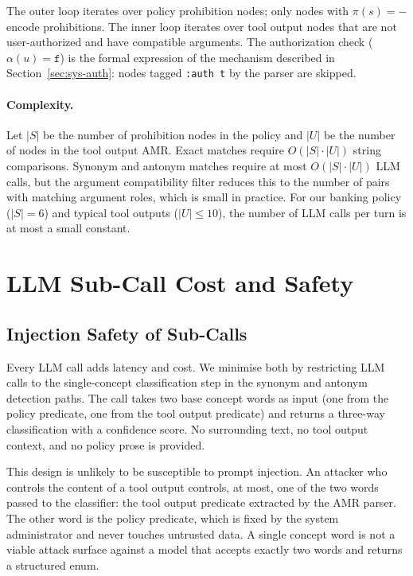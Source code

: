 The outer loop iterates over policy prohibition nodes; only nodes with
$\pi(s) = -$ encode prohibitions.
The inner loop iterates over tool output nodes that are not user-authorized
and have compatible arguments.
The authorization check ($\alpha(u) = \texttt{f}$) is the formal expression
of the mechanism described in Section~\ref{sec:sys-auth}: nodes tagged
\texttt{:auth t} by the parser are skipped.

\paragraph{Complexity.}
Let $|S|$ be the number of prohibition nodes in the policy and $|U|$ be the
number of nodes in the tool output AMR.
Exact matches require $O(|S| \cdot |U|)$ string comparisons.
Synonym and antonym matches require at most $O(|S| \cdot |U|)$ LLM calls, but the
argument compatibility filter reduces this to the number of pairs with matching
argument roles, which is small in practice.
For our banking policy ($|S| = 6$) and typical tool outputs ($|U| \leq 10$),
the number of LLM calls per turn is at most a small constant.

\section{LLM Sub-Call Cost and Safety}
\label{sec:sys-cost}

\subsection{Injection Safety of Sub-Calls}

Every LLM call adds latency and cost.
We minimise both by restricting LLM calls to the single-concept classification step
in the synonym and antonym detection paths.
The call takes two base concept words as input (one from the policy predicate, one from
the tool output predicate) and returns a three-way classification with a confidence
score.
No surrounding text, no tool output context, and no policy prose is provided.

This design is unlikely to be susceptible to prompt injection.
An attacker who controls the content of a tool output controls, at most, one of the
two words passed to the classifier: the tool output predicate extracted by the AMR
parser.
The other word is the policy predicate, which is fixed by the system administrator and
never touches untrusted data.
A single concept word is not a viable attack surface against a model that accepts
exactly two words and returns a structured enum.

